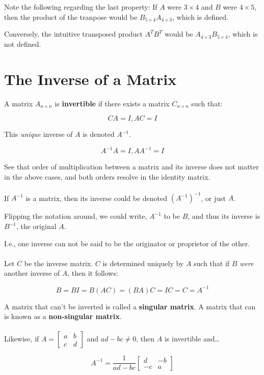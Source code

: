 \documentclass[12pt]{article}
\newcommand{\mb}{\begin{bmatrix}}
\newcommand{\me}{\end{bmatrix}}
\begin{document}
Note the following regarding the last property: If $A$ were $3 \times 4$ and $B$ were $4 \times 5$,
then the product of the tranpose would be $B_{5 \times 4}A_{4 \times 3}$, which is defined.

Conversely, the intuitive transposed product $A^TB^T$ would be $A_{4 \times 3}B_{5 \times 4}$, which is not defined.

\section*{The Inverse of a Matrix}

A matrix $A_{n\times n}$ is \textbf{invertible} if there exists a matrix $C_{n\times n}$ such that:

$$CA = I, AC = I$$

This \emph{unique} inverse of $A$ is denoted $A^{-1}$.

$$A^{-1}A = I, AA^{-1} = I$$

See that order of multiplication between a matrix and its inverse does not matter in the above cases,
and both orders resolve in the identity matrix. \\ \\

If $A^{-1}$ is a matrix, then its inverse could be denoted $(A^{-1})^{-1}$, or just $A$.

Flipping the notation around, we could write, $A^{-1}$ to be $B$, and thus its inverse is $B^{-1}$, the original $A$.

I.e., one inverse can not be said to be the originator or proprietor of the other. \\ \\

Let $C$ be the inverse matrix. $C$ is determined uniquely by $A$ such that if $B$ \emph{were} another inverse of $A$, then it follows:

$$B = BI = B(AC) = (BA)C = IC = C = A^{-1}$$

A matrix that can't be inverted is called a \textbf{singular matrix}. A matrix that can is known as a \textbf{non-singular matrix}. \\ \\

Likewise, if $A = \mb a & b \\ c & d \me$ and $ad-bc \neq 0$, then $A$ is invertible and\dots

$$A^{-1} = \frac{1}{ad - bc}\mb d & -b \\ -c & a \me$$
\end{document}
